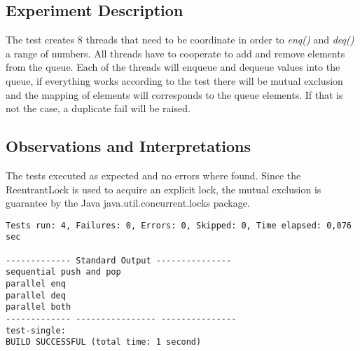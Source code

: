 
\subsection{Experiment Description} 
\par
The test creates $8$ threads that need to be coordinate in order to \textit{enq()} and \textit{deq()} a range of numbers. All threads have to cooperate to add and remove elements from the queue. Each of the threads will enqueue and dequeue values into the queue, if everything works according to the test there will be mutual exclusion and the mapping of elements will corresponds to the queue elements.
If that is not the case, a duplicate fail will be raised.
\par



\subsection{Observations and Interpretations}

\par
The tests executed as expected and no errors where found. Since the ReentrantLock is used to acquire an explicit lock, the mutual exclusion is guarantee by the Java java.util.concurrent.locks package.

\begin{lstlisting}[frame=single,breaklines=true]
Tests run: 4, Failures: 0, Errors: 0, Skipped: 0, Time elapsed: 0,076 sec

------------- Standard Output ---------------
sequential push and pop
parallel enq
parallel deq
parallel both
------------- ---------------- ---------------
test-single:
BUILD SUCCESSFUL (total time: 1 second)
\end{lstlisting}




